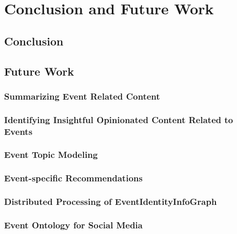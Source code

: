 
\chapter{Conclusion and Future Work} %

\label{ConclusionAndFutureWork} %


\section{Conclusion}

\section{Future Work}

\subsection{Summarizing Event Related Content}

\subsection{Identifying Insightful Opinionated Content Related to Events}

\subsection{Event Topic Modeling}

\subsection{Event-specific Recommendations}

\subsection{Distributed Processing of EventIdentityInfoGraph}

\subsection{Event Ontology for Social Media}